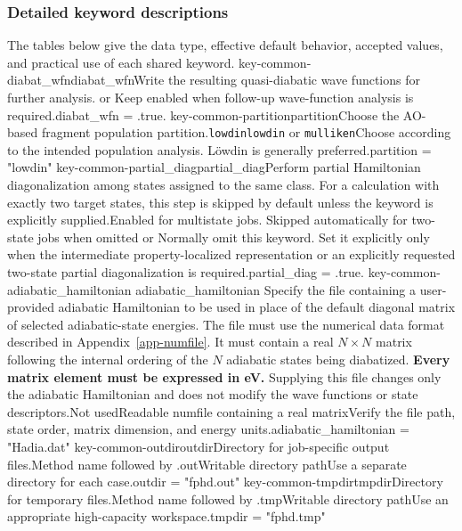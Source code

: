 \subsubsection*{Detailed keyword descriptions}
The tables below give the data type, effective default behavior, accepted values, and practical use of each shared keyword.
\keyword
{key-common-diabat_wfn}{diabat\_wfn}{Write the resulting quasi-diabatic wave functions for further analysis.}{\OpOptional}{\OpLogic}{\OpTrue}{\OpTrue{} or \OpFalse}{Keep enabled when follow-up wave-function analysis is required.}{diabat\_wfn = .true.}
\keyword
{key-common-partition}{partition}{Choose the AO-based fragment population partition.}{\OpOptional}{\OpString}{\texttt{lowdin}}{\texttt{lowdin} or \texttt{mulliken}}{Choose according to the intended population analysis. L\"owdin is generally preferred.}{partition = "lowdin"}
\keyword
{key-common-partial_diag}{partial\_diag}{Perform partial Hamiltonian diagonalization among states assigned to the same class. For a calculation with exactly two target states, this step is skipped by default unless the keyword is explicitly supplied.}{\OpOptional}{\OpLogic}{Enabled for multistate jobs. Skipped automatically for two-state jobs when omitted}{\OpTrue{} or \OpFalse}{Normally omit this keyword. Set it explicitly only when the intermediate property-localized representation or an explicitly requested two-state partial diagonalization is required.}{partial\_diag = .true.}
\keyword
{key-common-adiabatic_hamiltonian}
{adiabatic\_hamiltonian}
{Specify the file containing a user-provided adiabatic Hamiltonian to be used in place of the default diagonal matrix of selected adiabatic-state energies. The file must use the numerical data format described in Appendix~\ref{app-numfile}. It must contain a real $N\times N$ matrix following the internal ordering of the $N$ adiabatic states being diabatized. \textbf{Every matrix element must be expressed in eV.} Supplying this file changes only the adiabatic Hamiltonian and does not modify the wave functions or state descriptors.}{\OpOptional}{\OpString}{Not used}{Readable numfile containing a real matrix}{Verify the file path, state order, matrix dimension, and energy units.}{adiabatic\_hamiltonian = "Hadia.dat"}
\keyword
{key-common-outdir}{outdir}{Directory for job-specific output files.}{\OpOptional}{\OpString}{Method name followed by .out}{Writable directory path}{Use a separate directory for each case.}{outdir = "fphd.out"}
\keyword
{key-common-tmpdir}{tmpdir}{Directory for temporary files.}{\OpOptional}{\OpString}{Method name followed by .tmp}{Writable directory path}{Use an appropriate high-capacity workspace.}{tmpdir = "fphd.tmp"}

